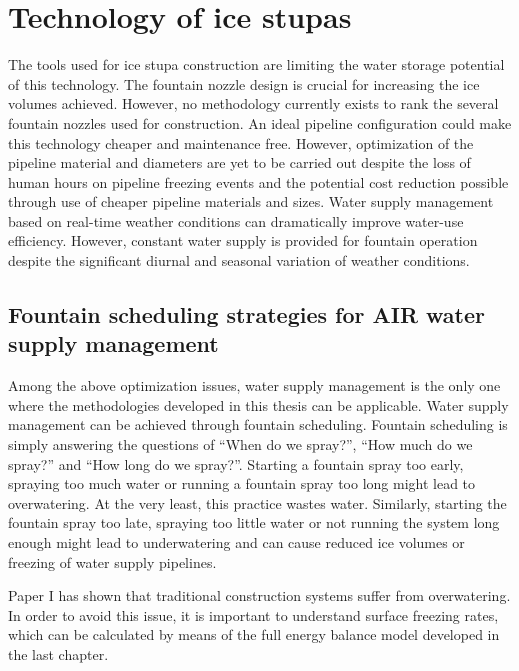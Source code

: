 \chapter{Technology of ice stupas}
\label{chap:tech}


The tools used for ice stupa construction are limiting the water storage potential of this technology. The
fountain nozzle design is crucial for increasing the ice volumes achieved. However, no methodology currently
exists to rank the several fountain nozzles used for construction. An ideal pipeline configuration could make
this technology cheaper and maintenance free. However, optimization of the pipeline material and diameters are
yet to be carried out despite the loss of human hours on pipeline freezing events and the potential cost
reduction possible through use of cheaper pipeline materials and sizes. Water supply management based on
real-time weather conditions can dramatically improve water-use efficiency. However, constant water supply is
provided for fountain operation despite the significant diurnal and seasonal variation of weather conditions.

\section{Fountain scheduling strategies for AIR water supply management}

Among the above optimization issues, water supply management is the only one where the methodologies developed
in this thesis can be applicable. Water supply management can be achieved through fountain scheduling. Fountain
scheduling is simply answering the questions of “When do we spray?”, “How much do we spray?” and “How long do we
spray?”. Starting a fountain spray too early, spraying too much water or running a fountain spray too long might
lead to overwatering. At the very least, this practice wastes water.  Similarly, starting the fountain spray too
late, spraying too little water or not running the system long enough might lead to underwatering and can cause
reduced ice volumes or freezing of water supply pipelines.

Paper I has shown that traditional construction systems suffer from overwatering. In order to avoid this issue,
it is important to understand surface freezing rates, which can be calculated by means of the full energy
balance model developed in the last chapter.

